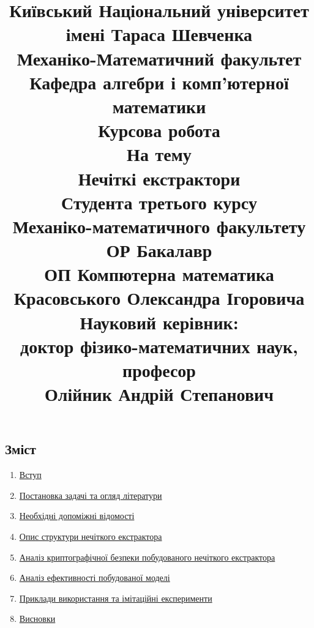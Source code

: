 \documentclass[11pt]{article}
\date{}
\title{
      \small{Київський Національний університет імені Тараса Шевченка}\\
      \small{Механіко-Математичний факультет}\\
      \small{Кафедра алгебри і комп'ютерної математики}\\
      \normalfont 
      \vspace{30ex}
      \bf{\huge{Курсова робота}}\\
      \normalfont 
      \vspace{5ex}
      \Large{На тему}\\
      \Large{Нечіткі екстрактори}\\
      \vspace{15ex}
      \small{Студента третього курсу}\\
      \small{Механіко-математичного факультету}\\
      \small{ОР Бакалавр}\\
      \small{ОП Компютерна математика}\\
      \small{Красовського Олександра Ігоровича}\\
      \vspace{10ex}
      \small{Науковий керівник:}\\
      \small{доктор фізико-математичних наук, професор}\\
      \small{Олійник Андрій Степанович}\\
      \vspace{15ex}
    }
\providecommand{\tightlist}{%
      \setlength{\itemsep}{0pt}\setlength{\parskip}{0pt}}
\begin{document}
    
    \maketitle
    \hypertarget{fuzzy-extractors}{%
    \section*{}\label{fuzzy-extractors}}
    
    \hypertarget{ux437ux43cux456ux441ux442}{%
\subsection{Зміст}\label{ux437ux43cux456ux441ux442}}

\vspace{2ex}
\begin{enumerate}
\def\labelenumi{\arabic{enumi}.}
\tightlist
\item
  \hyperref[нечіткі-екстрактори]{Вступ}
  \vspace{2ex}
\item
  \hyperref[постановка-задачі-та-огляд-літератури]{Постановка задачі та огляд літератури}
  \vspace{2ex}
\item
  \hyperref[необхідні-допоміжні-відомості]{Необхідні допоміжні відомості}
  \vspace{2ex}
\item
  \hyperref[опис-структури-нечіткого-екстрактора]{Опис структури нечіткого екстрактора}
  \vspace{2ex}
\item
  \hyperref[аналіз-криптографічної-безпеки-побудованого-нечіткого-екстрактора]{Аналіз криптографічної безпеки побудованого нечіткого екстрактора}
  \vspace{2ex}
\item
  \hyperref[аналіз-ефективності-побудованої-моделі]{Аналіз ефективності побудованої моделі}
  \vspace{2ex}
\item
  \hyperref[приклади-використання]{Приклади використання та імітаційні експерименти}
  \vspace{2ex}
\item
  \hyperref[висновки]{Висновки}
  \vspace{2ex}
\end{enumerate}
\vspace{100ex}
\end{document}
